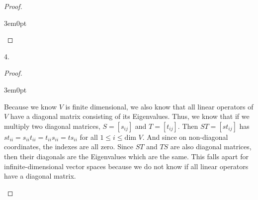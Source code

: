 \documentclass[11pt]{article}
\newenvironment{myproof}
{\begin{proof} \begin{adjustwidth}{3em}{0pt}$ $\par\nobreak\ignorespaces}
{\end{adjustwidth} \end{proof}}
\begin{document}
\begin{flushleft}
\begin{myproof}
\end{myproof}

\newpage

4.

\begin{myproof}

Because we know $V$ is finite dimensional, we also know that all linear operators of $V$ have a diagonal matrix consisting of its Eigenvalues. Thus, we know that if we multiply two diagonal matrices, $S = [s_{ij}]$ and $T = [t_{ij}]$. Then $ST = [st_{ij}]$ has $st_{ii} = s_{ii}t_{ii} = t_{ii}s_{ii} = ts_{ii}$ for all $1 \leq i \leq \text{dim } V$. And since on non-diagonal coordinates, the indexes are all zero. Since $ST$ and $TS$ are also diagonal matrices, then their diagonals are the Eigenvalues which are the same. This falls apart for infinite-dimensional vector spaces because we do not know if all linear operators have a diagonal matrix.

\end{myproof}


\end{flushleft}
\end{document}
